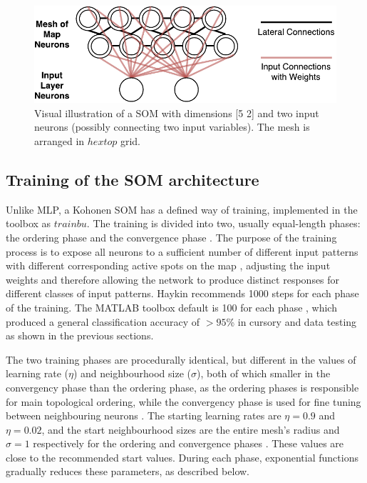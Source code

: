 \documentclass[10pt, oneside]{article}
\begin{document}
\begin{figure}[h]
\begin{center}
\includegraphics[width=12cm]{som-visual.pdf} 
\end{center}
\caption{\label{fig:som-visual} Visual illustration of a SOM with dimensions [5 2] and two input neurons (possibly connecting two input variables). The mesh is arranged in $hextop$ grid.}
\end{figure}

\subsection{Training of the SOM architecture} \label{subsec:training}
 
Unlike MLP, a Kohonen SOM has a defined way of training, implemented in the toolbox as $trainbu$. The training is divided into two, usually equal-length phases: the ordering phase and the convergence phase \cite[p. 23]{som-lecture}. The purpose of the training process is to expose all neurons to a sufficient number of different input patterns with different corresponding active spots on the map \cite[p. 429]{haykin2008}, adjusting the input weights and therefore allowing the network to produce distinct responses for different classes of input patterns. Haykin \cite[p. 435]{haykin2008} recommends 1000 steps for each phase of the training. The MATLAB toolbox default is 100 for each phase \cite{som-matlab}, which produced a general classification accuracy of $>95$\% in cursory and data testing as shown in the previous sections.

The two training phases are procedurally identical, but different in the values of learning rate ($\eta$) and neighbourhood size ($\sigma$), both of which smaller in the convergency phase than the ordering phase, as the ordering phases is responsible for main topological ordering, while the convergency phase is used for fine tuning between neighbouring neurons \cite[p. 23]{som-lecture}. The starting learning rates are $\eta=0.9$ and $\eta=0.02$, and the start neighbourhood sizes are the entire mesh's radius and $\sigma=1$ respectively for the ordering and convergence phases \cite{newsom-matlab}. These values are close to the recommended start values\cite[p. 23]{som-lecture}. During each phase, exponential functions gradually reduces these parameters, as described below.
\end{document}
